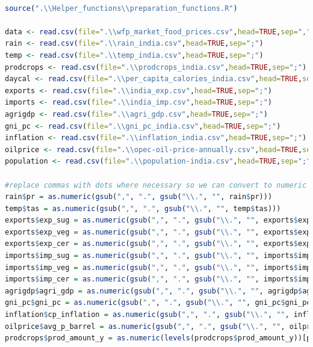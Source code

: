 \documentclass[11pt]{article}
\begin{document}
\begin{lstlisting}[language= R]

source(".\\Helper_functions\\preparation_functions.R")

data <- read.csv(file=".\\wfp_market_food_prices.csv",head=TRUE,sep=",")
rain <- read.csv(file=".\\rain_india.csv",head=TRUE,sep=";")
temp <- read.csv(file=".\\temp_india.csv",head=TRUE,sep=";")
prodcrops <- read.csv(file=".\\prodcrops_india.csv",head=TRUE,sep=";")
daycal <- read.csv(file=".\\per_capita_calories_india.csv",head=TRUE,sep=";")
exports <- read.csv(file=".\\india_exp.csv",head=TRUE,sep=";")
imports <- read.csv(file=".\\india_imp.csv",head=TRUE,sep=";")
agrigdp <- read.csv(file=".\\agri_gdp.csv",head=TRUE,sep=";")
gni_pc <- read.csv(file=".\\gni_pc_india.csv",head=TRUE,sep=";")
inflation <- read.csv(file=".\\inflation_india.csv",head=TRUE,sep=";")
oilprice <- read.csv(file=".\\opec-oil-price-annually.csv",head=TRUE,sep=";")
population <- read.csv(file=".\\population-india.csv",head=TRUE,sep=";")

#replace commas with dots where necessary so we can convert to numeric
rain$pr = as.numeric(gsub(",", ".", gsub("\\.", "", rain$pr)))
temp$tas = as.numeric(gsub(",", ".", gsub("\\.", "", temp$tas)))
exports$exp_sug = as.numeric(gsub(",", ".", gsub("\\.", "", exports$exp_sug)))
exports$exp_veg = as.numeric(gsub(",", ".", gsub("\\.", "", exports$exp_veg)))
exports$exp_cer = as.numeric(gsub(",", ".", gsub("\\.", "", exports$exp_sug)))
imports$imp_sug = as.numeric(gsub(",", ".", gsub("\\.", "", imports$imp_sug)))
imports$imp_veg = as.numeric(gsub(",", ".", gsub("\\.", "", imports$imp_veg)))
imports$imp_cer = as.numeric(gsub(",", ".", gsub("\\.", "", imports$imp_cer)))
agrigdp$agri_gdp = as.numeric(gsub(",", ".", gsub("\\.", "", agrigdp$agri_gdp)))
gni_pc$gni_pc = as.numeric(gsub(",", ".", gsub("\\.", "", gni_pc$gni_pc)))
inflation$cp_inflation = as.numeric(gsub(",", ".", gsub("\\.", "", inflation$cp_inflation)))
oilprice$avg_p_barrel = as.numeric(gsub(",", ".", gsub("\\.", "", oilprice$avg_p_barrel)))
prodcrops$prod_amount_y = as.numeric(levels(prodcrops$prod_amount_y))[prodcrops$prod_amount_y]





\end{lstlisting}
\end{document}
